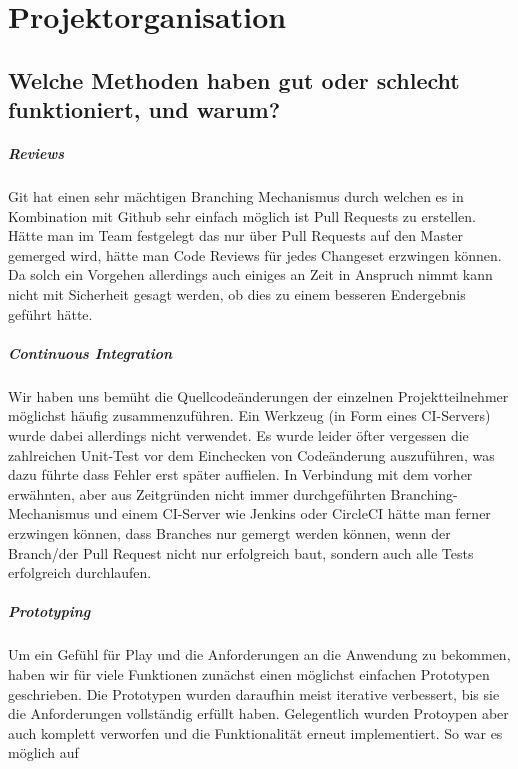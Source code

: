 \documentclass[12pt,DIV14,BCOR10mm,a4paper,parskip=half-,headsepline,headinclude,english,ngerman,bibliography=totocnumbered]{scrreprt}
\begin{document}
\vspace*{-3cm}

\tableofcontents  %

\chapter{Projektorganisation}


\section{Welche Methoden haben gut oder schlecht funktioniert, und warum?}

\paragraph{Reviews}
Git hat einen sehr mächtigen Branching Mechanismus durch welchen es in Kombination mit Github sehr einfach möglich ist Pull Requests zu erstellen. Hätte man im Team festgelegt das nur über Pull Requests auf den Master gemerged wird, hätte man Code Reviews für jedes Changeset erzwingen können. Da solch ein Vorgehen allerdings auch einiges an Zeit in Anspruch nimmt kann nicht mit Sicherheit gesagt werden, ob dies zu einem besseren Endergebnis geführt hätte.

\paragraph{Continuous Integration}
Wir haben uns bemüht die Quellcodeänderungen der einzelnen Projektteilnehmer möglichst häufig zusammenzuführen. Ein Werkzeug (in Form eines CI-Servers) wurde dabei allerdings nicht verwendet. Es wurde leider öfter vergessen die zahlreichen Unit-Test vor dem Einchecken von Codeänderung auszuführen, was dazu führte dass Fehler erst später auffielen.
In Verbindung mit dem vorher erwähnten, aber aus Zeitgründen nicht immer durchgeführten Branching-Mechanismus und einem CI-Server wie Jenkins oder CircleCI hätte man ferner erzwingen können, dass Branches nur gemergt werden können, wenn der Branch/der Pull Request nicht nur erfolgreich baut, sondern auch alle Tests erfolgreich durchlaufen.

\paragraph{Prototyping}
Um ein Gefühl für Play und die Anforderungen an die Anwendung zu bekommen, haben wir für viele Funktionen zunächst einen möglichst einfachen Prototypen geschrieben. Die Prototypen wurden daraufhin meist iterative verbessert, bis sie die Anforderungen vollständig erfüllt haben. Gelegentlich wurden Protoypen aber auch komplett verworfen und die Funktionalität erneut implementiert. So war es möglich auf
\end{document}
